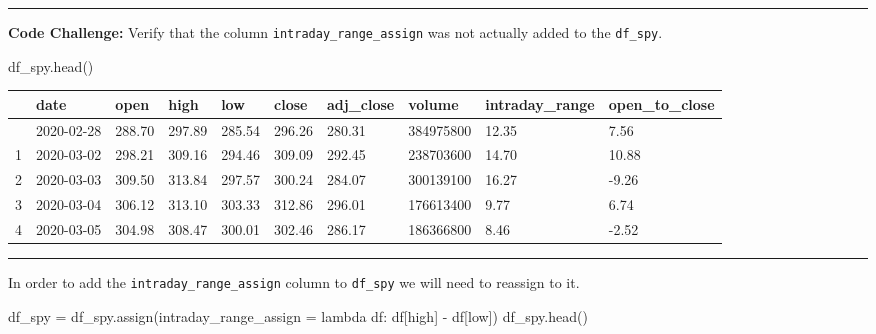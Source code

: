 \documentclass[
  letterpaper,
  DIV=11,
  numbers=noendperiod]{scrreprt}
\newenvironment{Shaded}{\begin{snugshade}}{\end{snugshade}}
\newcommand{\KeywordTok}[1]{\textcolor[rgb]{0.00,0.23,0.31}{#1}}
\newcommand{\NormalTok}[1]{\textcolor[rgb]{0.00,0.23,0.31}{#1}}
\newcommand{\OperatorTok}[1]{\textcolor[rgb]{0.37,0.37,0.37}{#1}}
\newcommand{\StringTok}[1]{\textcolor[rgb]{0.13,0.47,0.30}{#1}}
\begin{document}
\begin{center}\rule{0.5\linewidth}{0.5pt}\end{center}

\textbf{Code Challenge:} Verify that the column
\texttt{intraday\_range\_assign} was not actually added to the
\texttt{df\_spy}.

\begin{Shaded}
\begin{Highlighting}[]
\NormalTok{df\_spy.head()}
\end{Highlighting}
\end{Shaded}

\begin{longtable}[]{@{}llllllllll@{}}
\toprule\noalign{}
& date & open & high & low & close & adj\_close & volume &
intraday\_range & open\_to\_close \\
\midrule\noalign{}
\endhead
\bottomrule\noalign{}
\endlastfoot
0 & 2020-02-28 & 288.70 & 297.89 & 285.54 & 296.26 & 280.31 & 384975800
& 12.35 & 7.56 \\
1 & 2020-03-02 & 298.21 & 309.16 & 294.46 & 309.09 & 292.45 & 238703600
& 14.70 & 10.88 \\
2 & 2020-03-03 & 309.50 & 313.84 & 297.57 & 300.24 & 284.07 & 300139100
& 16.27 & -9.26 \\
3 & 2020-03-04 & 306.12 & 313.10 & 303.33 & 312.86 & 296.01 & 176613400
& 9.77 & 6.74 \\
4 & 2020-03-05 & 304.98 & 308.47 & 300.01 & 302.46 & 286.17 & 186366800
& 8.46 & -2.52 \\
\end{longtable}

\begin{center}\rule{0.5\linewidth}{0.5pt}\end{center}

In order to add the \texttt{intraday\_range\_assign} column to
\texttt{df\_spy} we will need to reassign to it.

\begin{Shaded}
\begin{Highlighting}[]
\NormalTok{df\_spy }\OperatorTok{=}\NormalTok{ df\_spy.assign(intraday\_range\_assign }\OperatorTok{=} \KeywordTok{lambda}\NormalTok{ df: df[}\StringTok{\textquotesingle{}high\textquotesingle{}}\NormalTok{] }\OperatorTok{{-}}\NormalTok{ df[}\StringTok{\textquotesingle{}low\textquotesingle{}}\NormalTok{])}
\NormalTok{df\_spy.head()}
\end{Highlighting}
\end{Shaded}
\end{document}

